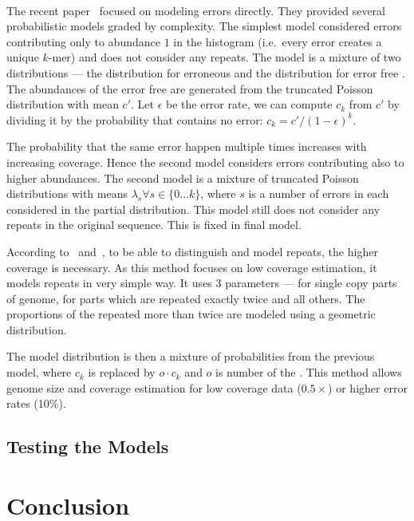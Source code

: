 \paragraph{} The recent paper~\cite{covest} focused on modeling errors directly. They provided several probabilistic models graded by complexity.
The simplest model considered errors contributing only to abundance $1$ in the histogram (i.e.\ every error creates a unique $k$-mer) and does not consider any repeats. The model is a mixture of two distributions --- the distribution for erroneous \kmers and the distribution for error free \kmers. The abundances of the error free \kmers are generated from the truncated Poisson distribution with mean $c'$. Let $\epsilon$ be the error rate, we can compute $c_k$ from $c'$ by dividing it by the probability that \kmer contains no error: $c_k = c'/{(1-\epsilon)}^k$.

The probability that the same error happen multiple times increases with increasing coverage. Hence the second model considers errors contributing also to higher abundances.
The second model is a mixture of truncated Poisson distributions with means $\lambda_s \forall s \in \{0\dots k\}$, where $s$ is a number of errors in each \kmer considered in the partial distribution. This model still does not consider any repeats in the original sequence.
This is fixed in final model.

According to~\cite{waterman} and~\cite{williams}, to be able to distinguish and model repeats, the higher coverage is necessary. As this method focuses on low coverage estimation, it models repeats in very simple way. It uses 3 parameters --- for single copy parts of genome, for parts which are repeated exactly twice and all others. The proportions of the \kmers repeated more than twice are modeled using a geometric distribution.

The model distribution is then a mixture of probabilities from the previous model, where $c_k$ is replaced by $o \cdot c_k$ and $o$ is number of the \kmer.
This method allows genome size and coverage estimation for low coverage data ($0.5\times$) or higher error rates (10\%).

\subsection{Testing the Models}


\section{Conclusion}

